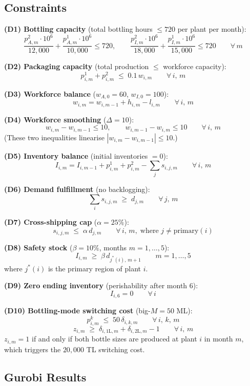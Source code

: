 \documentclass[12pt,a4paper]{article}
\begin{document}
\subsection*{Constraints}

\textbf{(D1) Bottling capacity} (total bottling hours $\leq 720$ per plant per month):
\[
  \frac{p^2_{A,m}\cdot10^6}{12{,}000}+\frac{p^1_{A,m}\cdot10^6}{10{,}000}\leq720,
  \qquad
  \frac{p^2_{I,m}\cdot10^6}{18{,}000}+\frac{p^1_{I,m}\cdot10^6}{15{,}000}\leq720
  \qquad\forall\,m
\]

\textbf{(D2) Packaging capacity} (total production $\leq$ workforce capacity):
\[
  p^1_{i,m}+p^2_{i,m}\;\leq\;0.1\,w_{i,m} \qquad\forall\,i,\,m
\]

\textbf{(D3) Workforce balance} ($w_{A,0}=60$, $w_{I,0}=100$):
\[
  w_{i,m}=w_{i,m-1}+h_{i,m}-l_{i,m} \qquad\forall\,i,\,m
\]

\textbf{(D4) Workforce smoothing} ($\Delta=10$):
\[
  w_{i,m}-w_{i,m-1}\leq 10, \qquad w_{i,m-1}-w_{i,m}\leq 10 \qquad\forall\,i,\,m
\]
(These two inequalities linearise $|w_{i,m}-w_{i,m-1}|\leq10$.)

\textbf{(D5) Inventory balance} (initial inventories $=0$):
\[
  I_{i,m}=I_{i,m-1}+p^1_{i,m}+p^2_{i,m}-\sum_{j}s_{i,j,m} \qquad\forall\,i,\,m
\]

\textbf{(D6) Demand fulfillment} (no backlogging):
\[
  \sum_{i}s_{i,j,m}\;\geq\;d_{j,m} \qquad\forall\,j,\,m
\]

\textbf{(D7) Cross-shipping cap} ($\alpha=25\%$):
\[
  s_{i,j,m}\;\leq\;\alpha\,d_{j,m}
  \qquad\forall\,i,\,m,\;\text{where }j\neq\text{primary}(i)
\]

\textbf{(D8) Safety stock} ($\beta=10\%$, months $m=1,\ldots,5$):
\[
  I_{i,m}\;\geq\;\beta\,d_{j^*(i),\,m+1} \qquad m=1,\ldots,5
\]
where $j^*(i)$ is the primary region of plant $i$.

\textbf{(D9) Zero ending inventory} (perishability after month 6):
\[
  I_{i,6}=0 \qquad\forall\,i
\]

\textbf{(D10) Bottling-mode switching cost} (big-$M=50$ ML):
\[
  p^k_{i,m}\;\leq\;50\,\delta_{i,k,m} \qquad\forall\,i,\,k,\,m
\]
\[
  z_{i,m}\;\geq\;\delta_{i,1\text{L},m}+\delta_{i,2\text{L},m}-1 \qquad\forall\,i,\,m
\]
$z_{i,m}=1$ if and only if both bottle sizes are produced at plant $i$ in month $m$,
which triggers the $20{,}000$ TL switching cost.

\subsection*{Gurobi Results}
\end{document}
